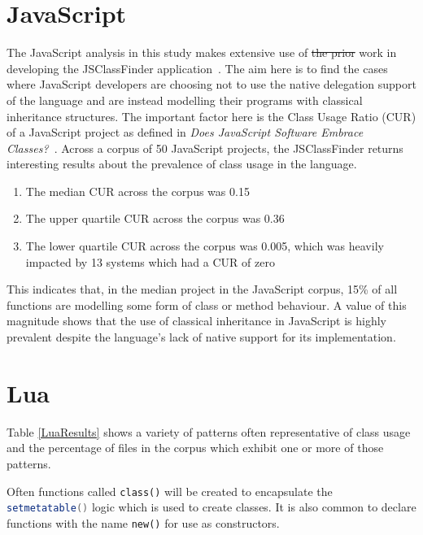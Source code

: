 \documentclass[11pt
              , a4paper
              , twoside
              , openright
              ]{report}
\newcommand{\java}[1]{\lstinline[language=Java]{#1}}
\newcommand{\code}[1]{\lstinline[language=code]{#1}}
\providecommand{\DIFadd}[1]{{\protect\color{blue}\uwave{#1}}} %
\providecommand{\DIFdel}[1]{{\protect\color{red}\sout{#1}}}                      %
\providecommand{\DIFaddbegin}{} %
\providecommand{\DIFaddend}{} %
\providecommand{\DIFdelbegin}{} %
\providecommand{\DIFdelend}{} %
\begin{document}
\DIFaddend \section{JavaScript}
The JavaScript analysis in this study makes extensive use of \DIFdelbegin \DIFdel{the prior }\DIFdelend \DIFaddbegin \DIFadd{Silva et al's }\DIFaddend work in developing the JSClassFinder application~\cite{JSClassFinder}. The aim here is to find the cases where JavaScript developers are choosing not to use the native delegation support of the language and are instead modelling their programs with classical inheritance structures. The important factor here is the Class Usage Ratio (CUR) of a JavaScript project as defined in \textit{Does JavaScript Software Embrace Classes?~\cite{JSClassFinder}}. Across a corpus of 50 JavaScript projects, the JSClassFinder returns interesting results about the prevalence of class usage in the language.
\begin{enumerate}
	\item The median CUR across the corpus was 0.15
	\item The upper quartile CUR across the corpus was 0.36
	\item The lower quartile CUR across the corpus was 0.005, which was heavily impacted by 13 systems which had a CUR of zero
\end{enumerate}

This indicates that, in the median project in the JavaScript corpus, 15\% of all functions are modelling some form of class or method behaviour. A value of this magnitude shows that the use of classical inheritance in JavaScript is highly prevalent despite the language's lack of native support for its implementation.

\section{Lua}
Table \ref{LuaResults} shows a variety of patterns often representative of class usage and the percentage of files in the corpus which exhibit one or more of those patterns.\newline

Often functions called \code{class()} will be created to encapsulate the \java{setmetatable()} logic which is used to create classes. It is also common to declare functions with the name \code{new()} for use as constructors.
\end{document}
